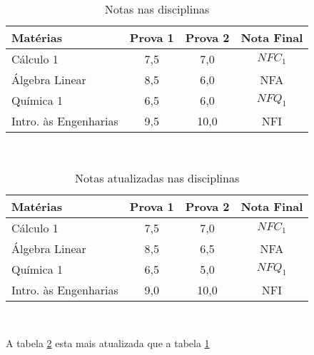 \documentclass[a4paper,12pt]{article}
\begin{document}
\begin{table}
    \centering 
    \begin{tabular}{l|c|c|c}\hline
    \textbf{Matérias}      & \textbf{Prova 1} & \textbf{Prova 2} & \textbf{Nota Final} \\\hline
    Cálculo 1              &  7,5 & 7,0 & $NFC_1$\\
    Álgebra Linear         &  8,5 & 6,0 & NFA\\
    Química 1              &  6,5 & 6,0 & $NFQ_1$\\
    Intro. às Engenharias  &  9,5 & 10,0& NFI\\
    \end{tabular}\\
    \caption{Notas nas disciplinas}
    \label{Tab01}
\end{table}

\begin{table}[!]
    \centering 
    \begin{tabular}{l|c|c|c}\hline
    \textbf{Matérias}      & \textbf{Prova 1} & \textbf{Prova 2} & \textbf{Nota Final} \\\hline
    Cálculo 1              &  7,5 & 7,0 & $NFC_1$\\
    Álgebra Linear         &  8,5 & 6,5 & NFA\\
    Química 1              &  6,5 & 5,0 & $NFQ_1$\\
    Intro. às Engenharias  &  9,0 & 10,0& NFI\\
    \end{tabular}\\
    \caption{Notas atualizadas nas disciplinas}
    \label{Tab02}
\end{table}

A tabela \ref{Tab02} esta mais atualizada que a tabela \ref{Tab01}
\end{document}
